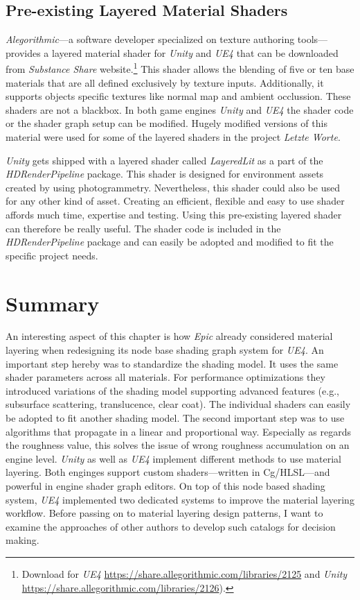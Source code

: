 \subsection{Pre-existing Layered Material Shaders}\label{sec:preexistingShaders}

\emph{Alegorithmic}---a software developer specialized on texture authoring tools---provides a layered material shader for \emph{Unity} and \emph{UE4} that can be downloaded from \emph{Substance Share} website.\footnote{Download for \emph{UE4} \url{https://share.allegorithmic.com/libraries/2125} and \emph{Unity }\url{https://share.allegorithmic.com/libraries/2126}).} This shader allows the blending of five or ten base materials that are all defined exclusively by texture inputs. Additionally, it supports objects specific textures like normal map and ambient occlussion. 
These shaders are not a blackbox. In both game engines \emph{Unity} and \emph{UE4} the shader code or the shader graph setup can be modified. Hugely modified versions of this material were used for some of the layered shaders in the project \emph{Letzte Worte}.

\emph{Unity} gets shipped with a layered shader called \emph{LayeredLit} as a part of the \emph{HDRenderPipeline} package. This shader is designed for environment assets created by using photogrammetry. Nevertheless, this shader could also be used for any other kind of asset. Creating an efficient, flexible and easy to use shader affords much time, expertise and testing. Using this pre-existing layered shader can therefore be really useful. The shader code is included in the \emph{HDRenderPipeline} package and can easily be adopted and modified to fit the specific project needs. 

\section{Summary}

An interesting aspect of this chapter is how \emph{Epic} already considered material layering  when redesigning its node base shading graph system for \emph{UE4}. An important step hereby was to standardize the shading model. It uses the same shader parameters across all materials. For performance optimizations they introduced variations of the shading model supporting advanced features (e.g., subsurface scattering, translucence, clear coat). The individual shaders can easily be adopted to fit another shading model. The second important step was to use algorithms that propagate in a linear and proportional way. Especially as regards the roughness value,  this solves the issue of wrong roughness accumulation on an engine level.
\emph{Unity} as well as \emph{UE4} implement different methods to use material layering. Both enginges support custom shaders---written in Cg/HLSL---and powerful in engine shader graph editors. On top of this node based shading system, \emph{UE4} implemented two dedicated systems to improve the material layering workflow. Before passing on to material layering design patterns, I want to examine the approaches of other authors to develop such catalogs for decision making.  


